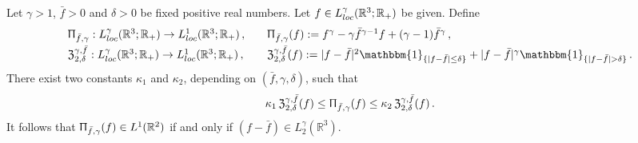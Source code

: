 \documentclass[10pt,a4paper]{amsart}
\def \R{{\mathbb{R}}}
\begin{document}
\begin{lemma}
  \label{lem:ORC}
  Let $\gamma >1$, $\bar f > 0$ and $\delta >0$ be fixed positive real numbers. Let $ f\in L_{\rm loc}^\gamma(\R^3;\R_+)$ be given. Define
  \[\begin{array}{ll}
    \Uppi_{ \bar f, \gamma } :  L_{\rm loc}^\gamma(\R^3;\R_+) \rightarrow L_{\rm loc}^1(\R^3;\R_+) \,, \quad & \Uppi_{\bar f,\gamma}(f) := f^\gamma - \gamma \bar{f}^{\gamma -1}f +(\gamma -1) {\bar f}^{\gamma} \,, \smallskip \\
    \mathfrak Z_{2,\delta}^{\gamma, \bar f}:   L_{\rm loc}^\gamma (\R^3;\R_+) \rightarrow L_{\rm loc}^1(\R^3;\R_+) \,, \quad & \mathfrak Z_{2,\delta}^{\gamma, \bar f}(f) := |f-\bar f|^2\mathbbm{1}_{\{|f-\bar f|\leq \delta \}} + |f-\bar f|^\gamma\mathbbm{1}_{\{|f-\bar f|> \delta \}} \, .
    \end{array} \]
There exist two constants $\kappa_1$ and $\kappa_2$, depending on $(\bar f, \gamma, \delta)$, such that
    \[
    \kappa_1\, \mathfrak Z_{2,\delta}^{\gamma,\bar f}(f) \leq  \Uppi_{\bar f,\gamma}(f) \leq  \kappa_2\, \mathfrak Z_{2,\delta}^{\gamma, \bar f}(f)\,. 
    \]
  It follows that $\Uppi_{\bar f,\gamma}(f) \in L^1(\R^2)$ if and only if $(f-\bar f) \in L_2^\gamma(\R^3)$.
\end{lemma}
\end{document}
